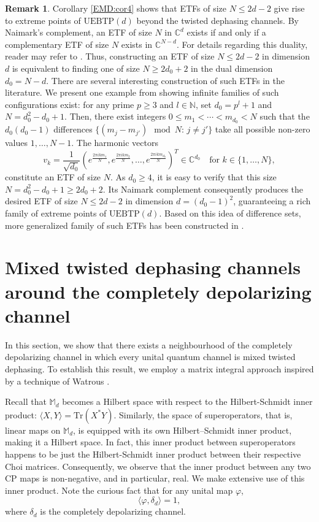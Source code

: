 \documentclass[11pt,reqno]{amsart}
\theoremstyle{definition}
\newtheorem{rmk}[defn]{Remark}
\theoremstyle{plain}
\theoremstyle{remark}
\numberwithin{equation}{section}%
\begin{document}
\begin{rmk}
	Corollary \ref{EMD:cor4} shows that ETFs of size $N \le 2d-2$ give rise to extreme points of $\mathrm{UEBTP}(d)$ beyond the twisted dephasing channels. By Naimark's complement, an ETF of size $N$ in $\mathbb{C}^d$ exists if and only if a complementary ETF of size $N$ exists in $\mathbb{C}^{N-d}$. For details regarding this duality, reader may refer to \cite{FicM:MayBR21, STDH}.  Thus, constructing an ETF of size $N \le 2d-2$ in dimension $d$ is equivalent to finding one of size $N \ge 2d_0+2$ in the dual dimension $d_0 = N-d$. There are several interesting construction of such ETFs in the literature. We present one example from \cite[Section 2.1.2]{SH} showing infinite families of such configurations exist: for any prime $p \ge 3$ and $l \in \mathbb{N}$, set $d_0= p^l+1$ and $N = d_0^2-d_0+1$. Then, there exist integers $0 \le m_1 < \cdots < m_{d_0} < N$ such that the $d_0(d_0-1)$ differences $\{(m_{j}-m_{j'})\mod N:\, j\ne j'\}$ take all possible non-zero values $1,\ldots, N-1$. The harmonic vectors 
	\[
	v_k = \frac{1}{\sqrt{d_0}} \left(e^{\frac{2\pi i k m_1}{N}}, e^{\frac{2\pi i k m_2}{N}}, \ldots, e^{\frac{2\pi i k m_{d_0}}{N}}\right)^T \in \mathbb{C}^{d_0} \quad \text{for }k\in\{1,\ldots,N\},
	\]
	constitute an ETF of size $N$. As $d_0\ge 4$, it is easy to verify that this size $N=d_0^2-d_0+1\ge 2d_0+2$. Its Naimark complement consequently produces the desired ETF of size $N \le 2d-2$ in dimension $d = (d_0-1)^2$, guaranteeing a rich family of extreme points of $\mathrm{UEBTP}(d)$. Based on this idea of difference sets, more generalized family of such ETFs has been constructed in \cite{XZG}.
\end{rmk}



\section{Mixed twisted dephasing channels around the completely depolarizing channel}\label{completely depolarizing channel}

In this section, we show that there exists a neighbourhood of the completely depolarizing channel in which every unital quantum channel is mixed twisted dephasing. To establish this result, we employ a matrix integral approach inspired by a technique of Watrous \cite{JW2}.
 

Recall that $\mathbb{M}_d$ becomes a Hilbert space with respect to the Hilbert-Schmidt inner product: $\langle X, Y\rangle=\text{Tr}(X^*Y)$. Similarly, the space of superoperators, that is, linear maps on $\mathbb{M}_d$, is equipped with its own Hilbert–Schmidt inner product, making it a Hilbert space. In fact,  this inner product between superoperators happens to be just the Hilbert-Schmidt inner product between their respective Choi matrices. Consequently, we observe that the inner product between any two CP maps is non-negative, and in particular, real. We make extensive use of this inner product. Note the curious fact that for any unital map $\varphi$, $$\langle\varphi, \delta _d\rangle=1,$$
where $\delta_d$ is the completely depolarizing channel.
\end{document}
